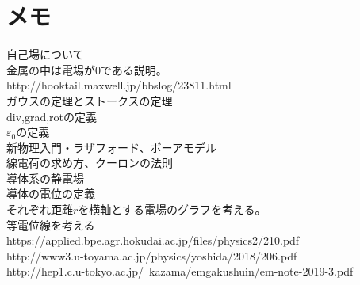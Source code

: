 \documentclass{jsarticle}
\begin{document}
\section*{メモ}
\noindent
自己場について\\
金属の中は電場が0である説明。\\
http://hooktail.maxwell.jp/bbslog/23811.html\\
ガウスの定理とストークスの定理\\
div,grad,rotの定義\\
\(\varepsilon_{0}\)の定義\\
新物理入門・ラザフォード、ボーアモデル\\
線電荷の求め方、クーロンの法則\\
導体系の静電場\\
導体の電位の定義\\
それぞれ距離\(r\)を横軸とする電場のグラフを考える。\\
等電位線を考える\\
https://applied.bpe.agr.hokudai.ac.jp/files/physics2/210.pdf\\
http://www3.u-toyama.ac.jp/physics/yoshida/2018/206.pdf\\
http://hep1.c.u-tokyo.ac.jp/~kazama/emgakushuin/em-note-2019-3.pdf\\
\end{document}
